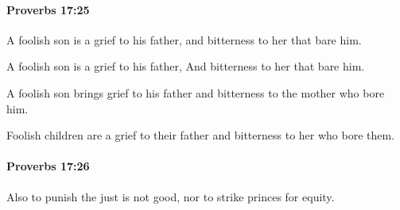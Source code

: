 		\paragraph{Proverbs 17:25} %
			\label{PROVERBS-17-25}

			A foolish son is a grief to his father, and bitterness to her that bare him.

			\begin{versebox}
					\item[BHS] 
					\item[ASV] A foolish son is a grief to his father, And bitterness to her that bare him.
					\item[NIV] A foolish son brings grief to his father and bitterness to the mother who bore him.
					\item[NRSV] Foolish children are a grief to their father and bitterness to her who bore them.
			\end{versebox}

		\paragraph{Proverbs 17:26} %
			\label{PROVERBS-17-26}

			Also to punish the just is not good, nor to strike princes for equity.

